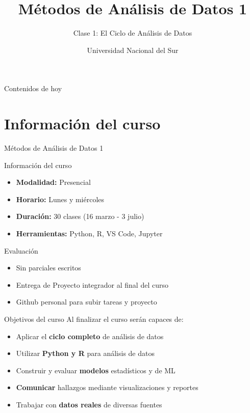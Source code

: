 \documentclass{beamer}
\title{Métodos de Análisis de Datos 1}
\subtitle{Clase 1: El Ciclo de Análisis de Datos}
\author{Universidad Nacional del Sur}
\institute{}
\date{}
\begin{document}
\begin{frame}
\titlepage
\end{frame}

\begin{frame}{Contenidos de hoy}
\tableofcontents
\end{frame}

\section{Información del curso}

\begin{frame}{Métodos de Análisis de Datos 1}
\begin{block}{Información del curso}
\begin{itemize}
    \item \textbf{Modalidad:} Presencial
    \item \textbf{Horario:} Lunes y miércoles
    \item \textbf{Duración:} 30 clases (16 marzo - 3 julio)
    \item \textbf{Herramientas:} Python, R, VS Code, Jupyter
\end{itemize}
\end{block}

\begin{block}{Evaluación}
\begin{itemize}
    \item Sin parciales escritos
    \item Entrega de Proyecto integrador al final del curso
    \item Github personal para subir tareas y proyecto
\end{itemize}
\end{block}
\end{frame}

\begin{frame}{Objetivos del curso}
Al finalizar el curso serán capaces de:

\begin{itemize}
    \item Aplicar el \textbf{ciclo completo} de análisis de datos
    \item Utilizar \textbf{Python y R} para análisis de datos
    \item Construir y evaluar \textbf{modelos} estadísticos y de ML
    \item \textbf{Comunicar} hallazgos mediante visualizaciones y reportes
    \item Trabajar con \textbf{datos reales} de diversas fuentes
\end{itemize}
\end{frame}
\end{document}
